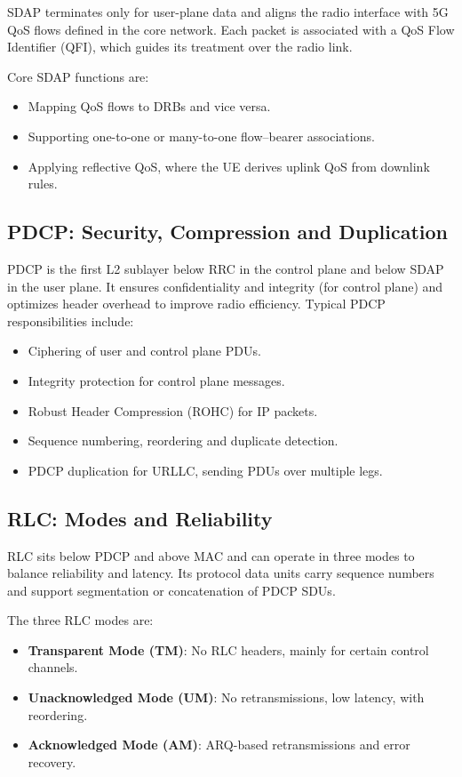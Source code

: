 \documentclass[12pt,a4paper]{article}
\begin{document}
SDAP terminates only for user-plane data and aligns the radio interface with 5G QoS flows defined in the core network. Each packet is associated with a QoS Flow Identifier (QFI), which guides its treatment over the radio link. 

Core SDAP functions are: 
\begin{itemize}
  \item Mapping QoS flows to DRBs and vice versa.
  \item Supporting one-to-one or many-to-one flow–bearer associations.
  \item Applying reflective QoS, where the UE derives uplink QoS from downlink rules.
\end{itemize}

\subsection{PDCP: Security, Compression and Duplication}

PDCP is the first L2 sublayer below RRC in the control plane and below SDAP in the user plane. It ensures confidentiality and integrity (for control plane) and optimizes header overhead to improve radio efficiency.
Typical PDCP responsibilities include: 
\begin{itemize}
  \item Ciphering of user and control plane PDUs.
  \item Integrity protection for control plane messages.
  \item Robust Header Compression (ROHC) for IP packets.
  \item Sequence numbering, reordering and duplicate detection.
  \item PDCP duplication for URLLC, sending PDUs over multiple legs.
\end{itemize}

\subsection{RLC: Modes and Reliability}

RLC sits below PDCP and above MAC and can operate in three modes to balance reliability and latency. Its protocol data units carry sequence numbers and support segmentation or concatenation of PDCP SDUs.

The three RLC modes are:
\begin{itemize}
  \item \textbf{Transparent Mode (TM)}: No RLC headers, mainly for certain control channels.
  \item \textbf{Unacknowledged Mode (UM)}: No retransmissions, low latency, with reordering.
  \item \textbf{Acknowledged Mode (AM)}: ARQ-based retransmissions and error recovery.
\end{itemize}
\end{document}
